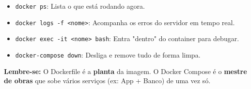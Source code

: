 \documentclass[12pt,a4paper]{article}
\begin{document}
\begin{boxAtividade}
\begin{itemize}
    \item \texttt{docker ps}: Lista o que está rodando agora.
    \item \texttt{docker logs -f <nome>}: Acompanha os erros do servidor em tempo real.
    \item \texttt{docker exec -it <nome> bash}: Entra "dentro" do container para debugar.
    \item \texttt{docker-compose down}: Desliga e remove tudo de forma limpa.
\end{itemize}
\end{boxAtividade}

\begin{boxDestaque}
\textbf{Lembre-se:} O Dockerfile é a \textbf{planta} da imagem. O Docker Compose é o \textbf{mestre de obras} que sobe vários serviços (ex: App + Banco) de uma vez só.
\end{boxDestaque}
\end{document}
